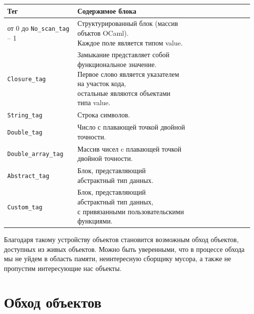 \begin{center}
    \begin{tabular}{| l | l | l | l | l | l | l | l | l | l | l |}
    \hline
    Тег & Содержимое блока \\
    \hline
    от 0 до \texttt{No\_scan\_tag} -- 1 & \shortstack[l]{Структурированный блок (массив объктов OCaml). \\ Каждое поле является типом value.} \\
    \hline
    \texttt{Closure\_tag} & \shortstack[l]{Замыкание представляет собой функциональное значение. \\ 
    Первое слово является указателем на участок кода,
    \\остальные являются объектами типа value.} \\
    \hline
    \texttt{String\_tag} & Строка символов. \\
    \hline
    \texttt{Double\_tag} & Число с плавающей точкой двойной точности. \\
    \hline
    \texttt{Double\_array\_tag} & Массив чисел c плавающей точкой двойной точности. \\
    \hline
    \texttt{Abstract\_tag} & Блок, представляющий абстрактный тип данных. \\
    \hline
    \texttt{Custom\_tag} & \shortstack[l]{Блок, представляющий абстрактный тип данных, \\
    с привязанными пользовательскими функциями.} \\
    \hline
    \end{tabular}
\end{center}

Благодаря такому устройству объектов становится возможным обход объектов, доступных из живых объектов. Можно быть уверенными,
что в процессе обхода мы не уйдем в область памяти, неинтересную сборщику мусора, а также не пропустим интересующие нас объекты. 

\section{Обход объектов}


